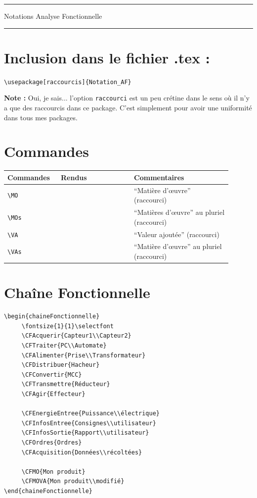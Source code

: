 \documentclass[a4paper,12pt]{article}
\begin{document}
	\begin{center}
		\hrule{\Large Notations Analyse Fonctionnelle}\\\hrule
	\end{center}

	\section{Inclusion dans le fichier .tex :}

		\verb!\usepackage[raccourcis]{Notation_AF}!

		\textbf{Note :} Oui, je sais... l'option \verb!raccourci! est un peu crétine dans le sens où il n'y a que des raccourcis dans ce package.
								C'est simplement pour avoir une uniformité dans tous mes packages.

	\section{Commandes}

		\noindent
		\begin{tabular}{|p{0.2\linewidth}|p{0.3\linewidth}|p{0.4\linewidth}|}
			\hline
				\textbf{Commandes}&\textbf{Rendus}&\textbf{Commentaires}
			\\\hline\hline
				\verb!\MO!	&	\MO	&	``Matière d'\oe uvre'' (raccourci)
			\\\hline
				\verb!\MOs!	&	\MOs	&	``Matières d'\oe uvre'' au pluriel (raccourci)
			\\\hline
				\verb!\VA!	&	\VA	&	``Valeur ajoutée'' (raccourci)
			\\\hline
				\verb!\VAs!	&	\VAs	&	``Matière d'\oe uvre'' au pluriel (raccourci)
			\\\hline
		\end{tabular}

	\section{Chaîne Fonctionnelle}

	
\begin{verbatim}
\begin{chaineFonctionnelle}
     \fontsize{1}{1}\selectfont
     \CFAcquerir{Capteur1\\Capteur2}
     \CFTraiter{PC\\Automate}
     \CFAlimenter{Prise\\Transformateur}
     \CFDistribuer{Hacheur}
     \CFConvertir{MCC}
     \CFTransmettre{Réducteur}
     \CFAgir{Effecteur}

     \CFEnergieEntree{Puissance\\électrique}
     \CFInfosEntree{Consignes\\utilisateur}
     \CFInfosSortie{Rapport\\utilisateur}
     \CFOrdres{Ordres}
     \CFAcquisition{Données\\récoltées}

     \CFMO{Mon produit}
     \CFMOVA{Mon produit\\modifié}
\end{chaineFonctionnelle}
\end{verbatim}
\end{document}
